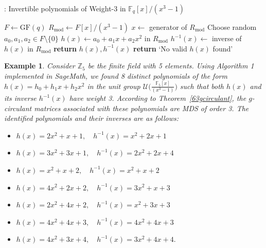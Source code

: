 \documentclass[12pt]{article}
\newtheorem{example}{Example}
\begin{document}
\begin{algorithm}
	\caption{\small{:  Invertible polynomials of  Weight-3 in $\mathbb{F}_q[x]/(x^3 - 1)$}}
	\small{
		\begin{algorithmic}[1]\label{6Algo1}
			\State $F \gets \text{GF}(q)$
			\State $R_{\text{mod}} \gets F[x]/(x^3 - 1)$
			\State $x \gets$ generator of $R_{\text{mod}}$
			\State Choose random $a_0, a_1, a_2 \in F \setminus \{0\}$
			\State $h(x) \gets a_0 + a_1 x + a_2 x^2$ in $R_{\text{mod}}$
			\State $h^{-1}(x) \gets$ inverse of $h(x)$ in $R_{\text{mod}}$
			\State \textbf{return} $h(x), h^{-1}(x)$
			\EndIf
			\EndIf
			\EndFor
			\State \textbf{return} `No valid $h(x)$ found'
			\EndProcedure
		\end{algorithmic}
	}
\end{algorithm}
\begin{example}
	 Consider $\mathbb{Z}_5$ be the finite field with 5 elements. Using Algorithm 1 implemented in SageMath, we found 8 distinct polynomials of the form \( h(x) = h_0 + h_1 x + h_2 x^2 \) in the unit group \( \mathcal{U}\bigg(\frac{\mathbb{F}_5[x]}{(x^3 - 1)}\bigg) \) such that both \( h(x) \) and its inverse \( h^{-1}(x) \) have weight 3. According to Theorem~\ref{63gcirculant}, the \(g\)-circulant matrices associated with these polynomials are MDS of order 3. The identified polynomials and their inverses are as follows:
	
	\begin{itemize}
		\item[(i)] \( h(x) = 2x^2 + x + 1,\quad h^{-1}(x) = x^2 + 2x + 1 \)
		\item [(ii)]\( h(x) = 3x^2 + 3x + 1,\quad h^{-1}(x) = 2x^2 + 2x + 4 \)
		\item[(iii)] \( h(x) = x^2 + x + 2,\quad h^{-1}(x) = x^2 + x + 2 \)
		\item [(iv)]\( h(x) = 4x^2 + 2x + 2,\quad h^{-1}(x) = 3x^2 + x + 3 \)
		\item[(v)] \( h(x) = 2x^2 + 4x + 2,\quad h^{-1}(x) = x^2 + 3x + 3 \)
		\item[(vi)] \( h(x) = 4x^2 + 4x + 3,\quad h^{-1}(x) = 4x^2 + 4x + 3 \)
		\item[(vii)] \( h(x) = 4x^2 + 3x + 4,\quad h^{-1}(x) = 3x^2 + 4x + 4.\)
	\end{itemize}
\end{example}
\end{document}
